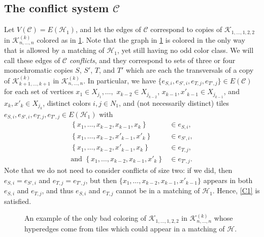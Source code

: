 \documentclass{article}
\theoremstyle{definition}
\newcommand\cH{{\mathcal H}}
\newcommand\cC{{\mathcal C}}
\newcommand\cK{{\mathcal K}}
\begin{document}
\subsection{The conflict system $\cC$} \label{sec:hypC}

    
    Let $V(\cC) = E(\cH_1)$, and let the edges of $\cC$ correspond to copies of $\cK_{1, \dots, 1,2,2}$ in $\cK_{n, \dots ,n}^{(k)}$ colored as in \cref{fig:bad_config}.  Note that the graph in \cref{fig:bad_config} is colored in the only way that is allowed by a matching of $\cH_1$, yet still having no odd color class.  We will call these edges of $\cC$ \emph{conflicts}, and they correspond to sets of three or four monochromatic copies $S$, $S'$, $T$, and $T'$ which are each the transversals of a copy of $\cK_{k+1,\dots,k+1}^{(k)}$ in $\cK_{n,\dots,n}^{(k)}$.  In particular, we have $\{e_{S,i},e_{S',i}, e_{T,j}, e_{T',j}\} \in E(\cC)$ for each set of vertices $x_1 \in X_{j_1}, \dots,$ $x_{k-2} \in X_{j_{k-2}}$, $x_{k-1}, x'_{k-1} \in X_{j_{k-1}}$, and $x_{k}, x'_{k} \in X_{j_{k}}$, distinct colors $i,j \in N_1$, and (not necessarily distinct) tiles $e_{S,i}, e_{S',i}, e_{T,j}, e_{T',j} \in E(\cH_1)$ with 
    \begin{align*}
    \left\{x_1, \dots, x_{k-2}, x_{k-1}, x_k\right\} &\in e_{S,i},\\
    \left\{x_1, \dots, x_{k-2}, x'_{k-1}, x'_k\right\} &\in e_{S',i},\\
    \left\{x_1, \dots, x_{k-2}, x'_{k-1}, x_k\right\} &\in e_{T,j},  \\
    \text{and }\left\{x_1, \dots, x_{k-2}, x_{k-1}, x'_k\right\} &\in e_{T',j}.
    \end{align*}
    Note that we do not need to consider conflicts of size two: if we did, then $e_{S,i} = e_{S',i}$ and $e_{T,j} = e_{T',j}$, but then $\{x_1, \dots, x_{k-2}, x_{k-1}, x'_{k-1}\}$ appears in both $e_{S,i}$ and $e_{T,j}$, and thus $e_{S,i}$ and $e_{T,j}$ cannot be in a matching of $\cH_1$.  Hence, \ref{C1} is satisfied.



    \begin{figure}[h!]
        \centering
        
        \caption{An example of the only bad coloring of $\cK_{1, \ldots ,1, 2, 2}$ in $\cK_{n,\dots,n}^{(k)}$ whose hyperedges come from tiles which could appear in a matching of $\cH$. }
        \label{fig:bad_config}
    \end{figure}
\end{document}
